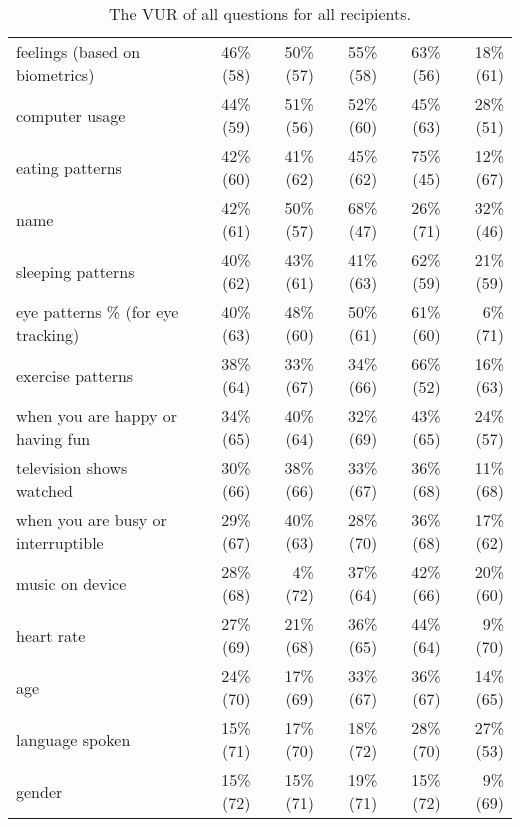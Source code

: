 \begin{table*}[t]
\begin{center}
\begin{tabular}{| l | r | r | r | r | r |}
feelings (based on biometrics) & 46\% (58) & 50\% (57) & 55\% (58) & 63\% (56) & 18\% (61) \\ 
computer usage& 44\% (59) & 51\% (56) & 52\% (60) & 45\% (63) & 28\% (51) \\ 
eating patterns & 42\% (60) & 41\% (62) & 45\% (62) & 75\% (45) & 12\% (67) \\ 
name & 42\% (61) & 50\% (57) & 68\% (47) & 26\% (71) & 32\% (46) \\ 
sleeping patterns & 40\% (62) & 43\% (61) & 41\% (63) & 62\% (59) & 21\% (59) \\ 
eye patterns \% (for eye tracking) & 40\% (63) & 48\% (60) & 50\% (61) & 61\% (60) & 6\% (71) \\ 
exercise patterns & 38\% (64) & 33\% (67) & 34\% (66) & 66\% (52) & 16\% (63) \\ 
when you are happy or having fun & 34\% (65) & 40\% (64) & 32\% (69) & 43\% (65) & 24\% (57) \\ 
television shows watched & 30\% (66) & 38\% (66) & 33\% (67) & 36\% (68) & 11\% (68) \\ 
when you are busy or interruptible & 29\% (67) & 40\% (63) & 28\% (70) & 36\% (68) & 17\% (62) \\ 
music on device & 28\% (68) & 4\% (72) & 37\% (64) & 42\% (66) & 20\% (60) \\ 
heart rate & 27\% (69) & 21\% (68) & 36\% (65) & 44\% (64) & 9\% (70) \\ 
age & 24\% (70) & 17\% (69) & 33\% (67) & 36\% (67) & 14\% (65) \\ 
language spoken & 15\% (71) & 17\% (70) & 18\% (72) & 28\% (70) & 27\% (53) \\ 
gender & 15\% (72) & 15\% (71) & 19\% (71) & 15\% (72) & 9\% (69) \\ 
\hline
\end{tabular}
\caption{The VUR of all questions for all recipients.}
\label{all-vur}
\end{center}
\end{table*}

